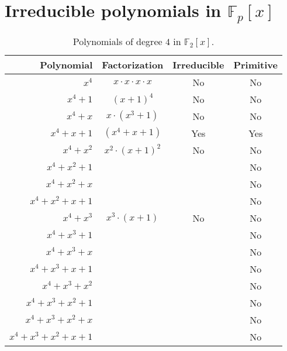 \section{Irreducible polynomials in $\mathbb{F}_p[x]$}

\begin{table}[!ht]
  \begin{center}
    \begin{tabular}{r|c|c|c} 
      \textbf{Polynomial} & \textbf{Factorization} & \textbf{Irreducible} & \textbf{Primitive}\\
      \hline
      $x^4$ & $x \cdot x \cdot x \cdot x$ & No & No \\
      \hline
      $x^4 + 1$ & $(x + 1)^4 $ & No & No \\
      \hline
      $x^4 + x$ & $x\cdot (x^3 + 1)$ & No & No \\
      \hline
      $x^4 + x + 1$ & $(x^4 + x + 1)$ & Yes & Yes \\
      \hline
      $x^4 + x^2$ & $x^2 \cdot (x + 1)^2$ & No & No \\
      \hline
      $x^4 + x^2 + 1$ & & & No \\
      \hline
      $x^4 + x^2 + x$ & & & No \\
      \hline
      $x^4 + x^2 + x + 1$ & & & No \\
      \hline
      $x^4 + x^3$ & $x^3 \cdot (x + 1)$ & No & No \\
      \hline
      $x^4 + x^3 + 1$ & & & No \\
      \hline
      $x^4 + x^3 + x$ & & & No \\
      \hline
      $x^4 + x^3 + x + 1$ & & & No \\
      \hline
      $x^4 + x^3 + x^2$ & & & No \\
      \hline
      $x^4 + x^3 + x^2 + 1$ & & & No \\
      \hline
      $x^4 + x^3 + x^2 + x$ & & & No \\
      \hline
      $x^4 + x^3 + x^2 + x + 1$ & & & No \\
      \hline
    \end{tabular}
    \caption{Polynomials of degree $4$ in $\mathbb{F}_{2}[x]$.}
    \label{tab:table1}
  \end{center}
\end{table}